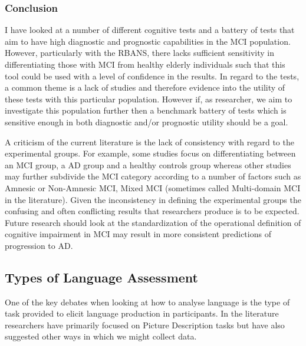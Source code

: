 \documentclass{article}
\begin{document}
\subsubsection{Conclusion}
I have looked at a number of different cognitive tests and a battery of tests that aim to have high diagnostic and prognostic capabilities in the MCI population. However, particularly with the RBANS, there lacks sufficient sensitivity in differentiating those with MCI from healthy elderly individuals such that this tool could be used with a level of confidence in the results. In regard to the tests, a common theme is a lack of studies and therefore evidence into the utility of these tests with this particular population. However if, as researcher, we aim to investigate this population further then a benchmark battery of tests which is sensitive enough in both diagnostic and/or prognostic utility should be a goal. 
\par 
A criticism of the current literature is the lack of consistency with regard to the experimental groups. For example, some studies focus on differentiating between an MCI group, a AD group and a healthy controls group whereas other studies may further subdivide the MCI category according to a number of factors such as Amnesic or Non-Amnesic MCI, Mixed MCI (sometimes called Multi-domain MCI in the literature). Given the inconsistency in defining the experimental groups the confusing and often conflicting results that researchers produce is to be expected. Future research should look at the standardization of the operational definition of cognitive impairment in MCI may result in more consistent predictions of progression to AD. 

\subsection{Types of Language Assessment}
One of the key debates when looking at how to analyse language is the type of task provided to elicit language production in participants. In the literature researchers have primarily focused on Picture Description tasks but have also suggested other ways in which we might collect data.
\par
\end{document}
